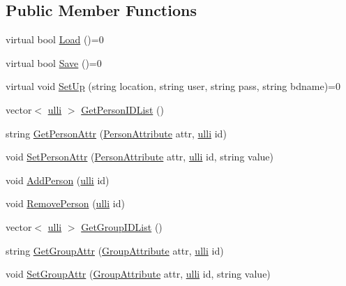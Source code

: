 \subsection*{Public Member Functions}
\begin{DoxyCompactItemize}
\item 
virtual bool \hyperlink{classRDataStorage_a0ccc1ba82aa66323b25f86fb76790a79}{Load} ()=0
\item 
virtual bool \hyperlink{classRDataStorage_a4a7cc6b1556fdaba1b13c3b3ffba6999}{Save} ()=0
\item 
virtual void \hyperlink{classRDataStorage_a82397a83bc5f1b27aed9ea2f2d09d899}{SetUp} (string location, string user, string pass, string bdname)=0
\item 
vector$<$ \hyperlink{DataStorage_8h_afebafa022413aaef27ce1b01cbfa9791}{ulli} $>$ \hyperlink{classRDataStorage_aa95ed0477efa694722602399c933072c}{GetPersonIDList} ()
\item 
string \hyperlink{classRDataStorage_ab4743e2154524cb80f2305eab616f7f6}{GetPersonAttr} (\hyperlink{DataStorage_8h_a91eab30aa0b680f2872e3a9e9a187d43}{PersonAttribute} attr, \hyperlink{DataStorage_8h_afebafa022413aaef27ce1b01cbfa9791}{ulli} id)
\item 
void \hyperlink{classRDataStorage_a9a5fadc71feb64f823939185394b9588}{SetPersonAttr} (\hyperlink{DataStorage_8h_a91eab30aa0b680f2872e3a9e9a187d43}{PersonAttribute} attr, \hyperlink{DataStorage_8h_afebafa022413aaef27ce1b01cbfa9791}{ulli} id, string value)
\item 
void \hyperlink{classRDataStorage_a424bc77d0725d708eda7fa43000b4da5}{AddPerson} (\hyperlink{DataStorage_8h_afebafa022413aaef27ce1b01cbfa9791}{ulli} id)
\item 
void \hyperlink{classRDataStorage_a2d92c90dd3e4b8cc6151b42896b95147}{RemovePerson} (\hyperlink{DataStorage_8h_afebafa022413aaef27ce1b01cbfa9791}{ulli} id)
\item 
vector$<$ \hyperlink{DataStorage_8h_afebafa022413aaef27ce1b01cbfa9791}{ulli} $>$ \hyperlink{classRDataStorage_a164f01d589a66796e3ae7d7058671821}{GetGroupIDList} ()
\item 
string \hyperlink{classRDataStorage_a27d32f01c1a002628aad816532a57178}{GetGroupAttr} (\hyperlink{DataStorage_8h_a4c949782f68874391d68d8c796501e06}{GroupAttribute} attr, \hyperlink{DataStorage_8h_afebafa022413aaef27ce1b01cbfa9791}{ulli} id)
\item 
void \hyperlink{classRDataStorage_ac7035db5876d5f93165da8cc33115b26}{SetGroupAttr} (\hyperlink{DataStorage_8h_a4c949782f68874391d68d8c796501e06}{GroupAttribute} attr, \hyperlink{DataStorage_8h_afebafa022413aaef27ce1b01cbfa9791}{ulli} id, string value)

\end{DoxyCompactItemize}
